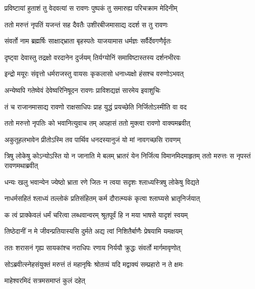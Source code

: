 
\twolineshloka
{प्रविष्टायां हुताशं तु वेदवत्यां स रावणः}
{पुष्पकं तु समारुह्य परिचक्राम मेदिनीम्} %

\twolineshloka
{ततो मरुत्तं नृपतिं यजन्तं सह दैवतैः}
{उशीरबीजमासाद्य ददर्श स तु रावणः} %

\twolineshloka
{संवर्तो नाम ब्रह्मर्षिः साक्षाद्भ्राता बृहस्पतेः}
{याजयामास धर्मज्ञः सर्वैर्देवगणैर्वृतः} %

\twolineshloka
{दृष्ट्वा देवास्तु तद्रक्षो वरदानेन दुर्जयम्}
{तिर्यग्योनिं समाविष्टास्तस्य दर्शनभीरवः} %

\twolineshloka
{इन्द्रो मयूरः संवृत्तो धर्मराजस्तु वायसः}
{कृकलासो धनाध्यक्षो हंसश्च वरुणोऽभवत्} %

\twolineshloka
{अन्येष्वपि गतेष्वेवं देवेष्वरिनिषूदन}
{रावणः प्राविशद्यज्ञं सारमेय इवाशुचिः} %

\twolineshloka
{तं च राजानमासाद्य रावणो राक्षसाधिपः}
{प्राह युद्धं प्रयच्छेति निर्जितोऽस्मीति वा वद} %

\twolineshloka
{ततो मरुत्तो नृपतिः को भवानित्युवाच तम्}
{अपहासं ततो मुक्त्वा रावणो वाक्यमब्रवीत्} %

\twolineshloka
{अकुतूहलभावेन प्रीतोऽस्मि तव पार्थिव}
{धनदस्यानुजं यो मां नावगच्छसि रावणम्} %

\threelineshloka
{त्रिषु लोकेषु कोऽन्योऽस्ति यो न जानाति मे बलम्}
{भ्रातरं येन निर्जित्य विमानमिदमाहृतम्}
{ततो मरुत्तः स नृपस्तं रावणमथाब्रवीत्} %

\twolineshloka
{धन्यः खलु भवान्येन ज्येष्ठो भ्राता रणे जितः}
{न त्वया सदृशः श्लाध्यस्त्रिषु लोकेषु विद्यते} %

\twolineshloka
{नाधर्मसहितं श्लाध्यं तल्लोकं प्रतिसंहितम्}
{कर्म दौरात्म्यकं कृत्वा श्लाघ्यसे भ्रातृनिर्जयात्} %

\twolineshloka
{क त्वं प्राक्केवलं धर्मं चरित्वा लब्धवान्वरम्}
{श्रूतपूर्वं हि न मया भाषसे यादृशं स्वयम्} %

\twolineshloka
{तिष्ठेदानीं न मे जीवन्प्रतियास्यसि दुर्मते}
{अद्य त्वां निशितैर्बाणैः प्रेषयामि यमक्षयम्} %

\twolineshloka
{ततः शरासनं गृह्य सायकांश्च नराधिपः}
{रणाय निर्ययौ क्रुद्धः संवर्तो मार्गमावृणोत्} %

\twolineshloka
{सोऽब्रवीत्स्नेहसंयुक्तं मरुत्तं तं महानृषिः}
{श्रोतव्यं यदि मद्वाक्यं सम्प्रहारो न ते क्षमः} %

\onelineshloka
{माहेश्वरमिदं सत्रमसमाप्तं कुलं दहेत्} %

